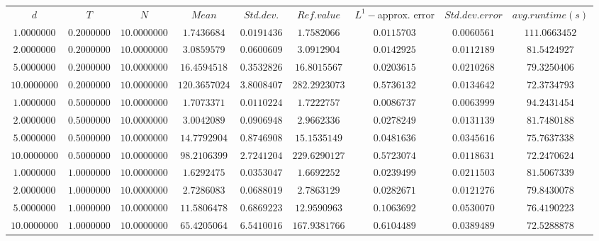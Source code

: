 \begin{tabular}{ccccccccc}
$d$ & $T$ & $N$ & $Mean$ & $Std. dev.$ & $Ref. value$ & $L^1-$approx. error & $Std. dev. error$ & $avg. runtime (s)$\\
$1.0000000$ & $0.2000000$ & $10.0000000$ & $1.7436684$ & $0.0191436$ & $1.7582066$ & $0.0115703$ & $0.0060561$ & $111.0663452$\\
$2.0000000$ & $0.2000000$ & $10.0000000$ & $3.0859579$ & $0.0600609$ & $3.0912904$ & $0.0142925$ & $0.0112189$ & $81.5424927$\\
$5.0000000$ & $0.2000000$ & $10.0000000$ & $16.4594518$ & $0.3532826$ & $16.8015567$ & $0.0203615$ & $0.0210268$ & $79.3250406$\\
$10.0000000$ & $0.2000000$ & $10.0000000$ & $120.3657024$ & $3.8008407$ & $282.2923073$ & $0.5736132$ & $0.0134642$ & $72.3734793$\\
$1.0000000$ & $0.5000000$ & $10.0000000$ & $1.7073371$ & $0.0110224$ & $1.7222757$ & $0.0086737$ & $0.0063999$ & $94.2431454$\\
$2.0000000$ & $0.5000000$ & $10.0000000$ & $3.0042089$ & $0.0906948$ & $2.9662336$ & $0.0278249$ & $0.0131139$ & $81.7480188$\\
$5.0000000$ & $0.5000000$ & $10.0000000$ & $14.7792904$ & $0.8746908$ & $15.1535149$ & $0.0481636$ & $0.0345616$ & $75.7637338$\\
$10.0000000$ & $0.5000000$ & $10.0000000$ & $98.2106399$ & $2.7241204$ & $229.6290127$ & $0.5723074$ & $0.0118631$ & $72.2470624$\\
$1.0000000$ & $1.0000000$ & $10.0000000$ & $1.6292475$ & $0.0353047$ & $1.6692252$ & $0.0239499$ & $0.0211503$ & $81.5067339$\\
$2.0000000$ & $1.0000000$ & $10.0000000$ & $2.7286083$ & $0.0688019$ & $2.7863129$ & $0.0282671$ & $0.0121276$ & $79.8430078$\\
$5.0000000$ & $1.0000000$ & $10.0000000$ & $11.5806478$ & $0.6869223$ & $12.9590963$ & $0.1063692$ & $0.0530070$ & $76.4190223$\\
$10.0000000$ & $1.0000000$ & $10.0000000$ & $65.4205064$ & $6.5410016$ & $167.9381766$ & $0.6104489$ & $0.0389489$ & $72.5288878$\\
\end{tabular}
